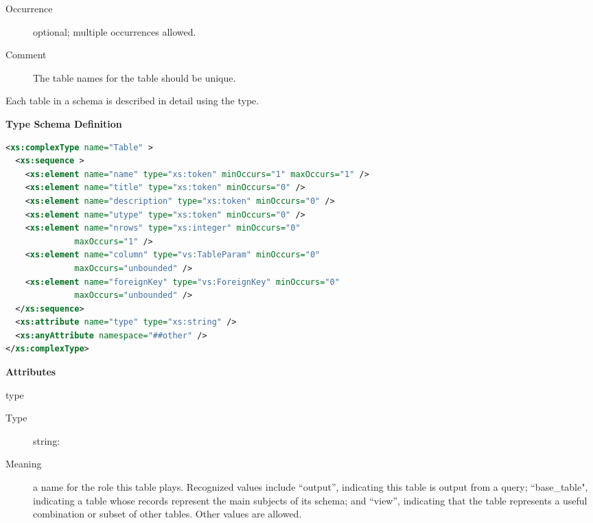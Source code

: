 \documentclass[11pt,a4paper]{ivoa}
\begin{document}
\begin{generated}
\begin{bigdescription}
\begin{description}
\item[Occurrence] optional; multiple occurrences allowed.
\item[Comment] 
               The table names for the table should be unique.
             

\end{description}


\end{bigdescription}\endgroup

\endgroup
\end{generated}



Each table in a schema is described in detail using the
 type.



\begin{generated}
\begingroup
      	\renewcommand*\descriptionlabel[1]{%
      	\hbox to 5.5em{\emph{#1}\hfil}}\vspace{1ex}\noindent\textbf{ Type Schema Definition}

\begin{lstlisting}[language=XML,basicstyle=\footnotesize]
<xs:complexType name="Table" >
  <xs:sequence >
    <xs:element name="name" type="xs:token" minOccurs="1" maxOccurs="1" />
    <xs:element name="title" type="xs:token" minOccurs="0" />
    <xs:element name="description" type="xs:token" minOccurs="0" />
    <xs:element name="utype" type="xs:token" minOccurs="0" />
    <xs:element name="nrows" type="xs:integer" minOccurs="0"
              maxOccurs="1" />
    <xs:element name="column" type="vs:TableParam" minOccurs="0"
              maxOccurs="unbounded" />
    <xs:element name="foreignKey" type="vs:ForeignKey" minOccurs="0"
              maxOccurs="unbounded" />
  </xs:sequence>
  <xs:attribute name="type" type="xs:string" />
  <xs:anyAttribute namespace="##other" />
</xs:complexType>
\end{lstlisting}

\vspace{0.5ex}\noindent\textbf{ Attributes}

\begingroup\small\begin{bigdescription}
\item[type]
\begin{description}
\item[Type] string: 
\item[Meaning] 
               a name for the role this table plays.  Recognized
               values include “output”, indicating this table is output 
               from a query; “base\_table{"}, indicating a table
               whose records represent the main subjects of its
               schema; and “view”, indicating that the table represents
               a useful combination or subset of other tables.  Other 
               values are allowed.  
            

\end{description}
\end{bigdescription}
\end{generated}
\end{document}
